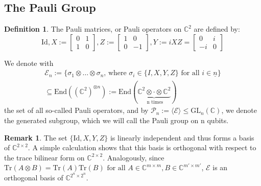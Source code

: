 \documentclass[12pt,a4paper,BCOR15mm,twoside,DIV12]{article}
\def\C{\mathbb{C}}
\def\GL{\text{GL}}
\def\n{\underline{n}}
\def\End{\text{End}}
\def\fa{\text{ for all }}
\def\Tr{\text{Tr}}
\def\Id{\text{Id}}
\theoremstyle{definition}
\newtheorem{rem}[Satz]{Remark}
\newtheorem{defn}[Satz]{Definition}
\begin{document}
\subsection{The Pauli Group}

\begin{defn}\label{paulimat}
The Pauli matrices, or Pauli operators on $\C^2$ are defined by:
\begin{equation} \Id , X :=  \left[ \begin{array}{cc}
 0 & 1 \\
 1 & 0 \end{array} \right] , Z := \left[ \begin{array}{cc}
 1 & 0 \\
 0 & -1 \end{array} \right],  Y := i XZ = \left[ \begin{array}{cc}
 0 & i \\
 -i & 0 \end{array} \right]  \end{equation}



We denote with \begin{align*} \mathcal{E}_n:= \{ \sigma_1 \otimes \ldots \otimes \sigma_n \text{, where }\sigma_i \in \{ I,X,Y,Z \} \fa i \in \n \} \\ \subseteq \End((\C^2)^{\otimes n}):= \End( \underbrace{\C^2 \otimes \cdot \otimes \C^2}_\text{ n times}) \end{align*}
the set of all so-called Pauli operators, and by $\mathcal{P}_n:= \langle \mathcal{E} \rangle \leq \GL_n(\C)$, we denote the generated subgroup, which we will call the Pauli group on n qubits. 
\end{defn}

\begin{rem}
The set $\{ \Id, X, Y, Z \}$ is linearly independent and thus forms a basis of $\C^{2 \times 2}$. A simple calculation shows that this basis is orthogonal with respect to the trace bilinear form on $\C^{2 \times 2}$. Analogously, since $\Tr(A \otimes B) = \Tr(A) \Tr(B) \fa A \in \C^{m \times m}, B \in \C^{m' \times m'}$, $\mathcal{E}$ is an orthogonal basis of $\C^{2^n \times 2^n}$.
\end{rem}

\end{document}
